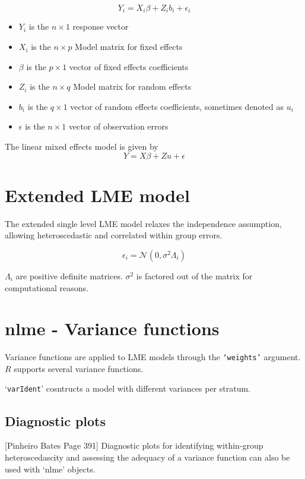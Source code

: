 \documentclass[12pt, a4paper]{report}
\theoremstyle{plain}
\theoremstyle{definition}
\theoremstyle{remark}
\begin{document}
\begin{displaymath}
Y_{i} =X_{i}\beta + Z_{i}b_{i} + \epsilon_{i}
\end{displaymath}
\begin{itemize}
	
	\item $Y_{i}$ is the $n \times 1$ response vector \item $X_{i}$ is
	the $n \times p$ Model matrix for fixed effects \item $\beta$ is
	the $p \times 1$ vector of fixed effects coefficients \item
	$Z_{i}$ is the $n \times q$ Model matrix for random effects \item
	$b_{i}$ is the $q \times 1$ vector of random effects coefficients,
	sometimes denoted as $u_{i}$ \item $\epsilon$ is the $n \times 1$
	vector of observation errors
\end{itemize}


The linear mixed effects model is given by
\begin{equation}
Y = X\beta + Zu + \epsilon
\end{equation}
\section{Extended LME model}
The extended single level LME model relaxes the independence assumption, allowing heteroscedastic and correlated within group errors.


\begin{equation}
\epsilon_{i} = \mathcal{N}(0, \sigma^2 \Lambda_{i})
\end{equation}

$\Lambda_{i}$ are positive definite matrices. $\sigma^2$ is factored out of the matrix for computational reasons.


\section{nlme - Variance functions}

Variance functions are applied to LME models through the \texttt{`weights'} argument. $R$ supports several variance functions.

`\texttt{varIdent}' cosntructs a model with different variances per stratum.

\subsection{Diagnostic plots}
[Pinheiro Bates Page 391] Diagnostic plots for identifying within-group heteroscedascity and assessing the adequacy of a variance function can also be used with `nlme' objects.
\end{document}

